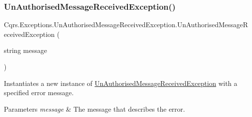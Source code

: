 \subsubsection{\texorpdfstring{Un\+Authorised\+Message\+Received\+Exception()}{UnAuthorisedMessageReceivedException()}\hspace{0.1cm}{\footnotesize\ttfamily [2/2]}}
{\footnotesize\ttfamily Cqrs.\+Exceptions.\+Un\+Authorised\+Message\+Received\+Exception.\+Un\+Authorised\+Message\+Received\+Exception (\begin{DoxyParamCaption}\item[{string}]{message }\end{DoxyParamCaption})}



Instantiates a new instance of \hyperlink{classCqrs_1_1Exceptions_1_1UnAuthorisedMessageReceivedException}{Un\+Authorised\+Message\+Received\+Exception} with a specified error message. 


\begin{DoxyParams}{Parameters}
{\em message} & The message that describes the error.\\
\hline
\end{DoxyParams}
